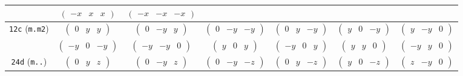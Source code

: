 \documentclass[fleqn,9pt,landscape]{jsarticle}
\begin{document}
\begin{center}
\begin{longtable}{ccccccc}
& $ \begin{pmatrix} - x & x & x \end{pmatrix} $ & $ \begin{pmatrix} - x & - x & - x \end{pmatrix} $ & $  $ & $  $ & $  $ & $  $ \\ \hline
{\tt 12c} ({\tt m.m2}) & $ \begin{pmatrix} 0 & y & y \end{pmatrix} $ & $ \begin{pmatrix} 0 & - y & y \end{pmatrix} $ & $ \begin{pmatrix} 0 & - y & - y \end{pmatrix} $ & $ \begin{pmatrix} 0 & y & - y \end{pmatrix} $ & $ \begin{pmatrix} y & 0 & - y \end{pmatrix} $ & $ \begin{pmatrix} y & - y & 0 \end{pmatrix} $ \\
& $ \begin{pmatrix} - y & 0 & - y \end{pmatrix} $ & $ \begin{pmatrix} - y & - y & 0 \end{pmatrix} $ & $ \begin{pmatrix} y & 0 & y \end{pmatrix} $ & $ \begin{pmatrix} - y & 0 & y \end{pmatrix} $ & $ \begin{pmatrix} y & y & 0 \end{pmatrix} $ & $ \begin{pmatrix} - y & y & 0 \end{pmatrix} $ \\ \hline
{\tt 24d} ({\tt m..}) & $ \begin{pmatrix} 0 & y & z \end{pmatrix} $ & $ \begin{pmatrix} 0 & - y & z \end{pmatrix} $ & $ \begin{pmatrix} 0 & - y & - z \end{pmatrix} $ & $ \begin{pmatrix} 0 & y & - z \end{pmatrix} $ & $ \begin{pmatrix} y & 0 & - z \end{pmatrix} $ & $ \begin{pmatrix} z & - y & 0 \end{pmatrix} $ \\

\end{longtable}
\end{center}
\end{document}
